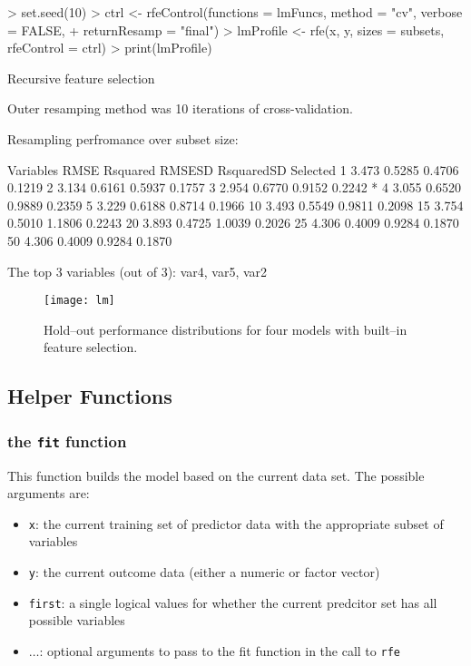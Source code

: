 \documentclass[12pt]{article}
\begin{document}
\begin{Schunk}
\begin{Sinput}
> set.seed(10)
> ctrl <- rfeControl(functions = lmFuncs, method = "cv", verbose = FALSE, 
+     returnResamp = "final")
> lmProfile <- rfe(x, y, sizes = subsets, rfeControl = ctrl)
> print(lmProfile)
\end{Sinput}
\begin{Soutput}
Recursive feature selection

Outer resamping method was 10 iterations of cross-validation. 

Resampling perfromance over subset size:

 Variables  RMSE Rsquared RMSESD RsquaredSD Selected
         1 3.473   0.5285 0.4706     0.1219         
         2 3.134   0.6161 0.5937     0.1757         
         3 2.954   0.6770 0.9152     0.2242        *
         4 3.055   0.6520 0.9889     0.2359         
         5 3.229   0.6188 0.8714     0.1966         
        10 3.493   0.5549 0.9811     0.2098         
        15 3.754   0.5010 1.1806     0.2243         
        20 3.893   0.4725 1.0039     0.2026         
        25 4.306   0.4009 0.9284     0.1870         
        50 4.306   0.4009 0.9284     0.1870         

The top 3 variables (out of 3):
   var4, var5, var2
\end{Soutput}
\end{Schunk}

\begin{figure}
   \begin{center}		
      \texttt{[image: lm]}
      \caption{Hold--out performance distributions for four models with built--in feature selection.}
      \label{F:lars} 
    \end{center}
\end{figure} 


\subsection{Helper Functions}

\subsubsection{the \texttt{fit} function}

This function builds the model based on the current data set. The possible arguments are:
\begin{itemize}
\item \texttt{x}: the current training set of predictor data with the appropriate subset of variables
\item \texttt{y}: the current outcome data (either a numeric or factor vector)
\item \texttt{first}: a single logical values for whether the current predcitor set has all possible variables
\item $\ldots$: optional arguments to pass to the fit function in the call to \texttt{rfe}
\end{itemize}
\end{document}
